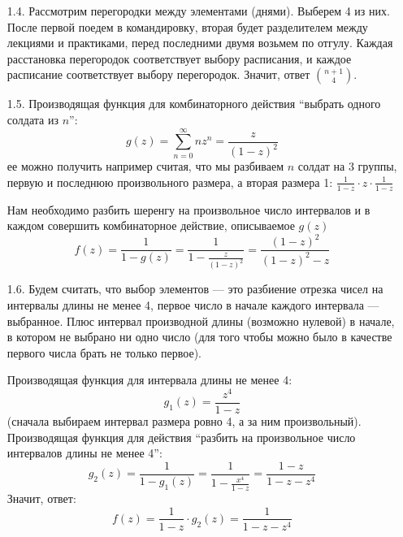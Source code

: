 \documentclass[10pt]{article}
\begin{document}
\begin{enumerate}
\item[1.4.] Рассмотрим перегородки между элементами (днями). Выберем 4 из них. После первой поедем в командировку, вторая будет разделителем между лекциями и практиками, перед последними двумя возьмем по отгулу. Каждая расстановка перегородок соответствует выбору расписания, и каждое расписание соответствует выбору перегородок. Значит, ответ $\binom{n+1}{4}$.

\item[1.5.] Производящая функция для комбинаторного действия ``выбрать одного солдата из $n$'': 
$$g(z) = \sum_{n=0}^\infty n z^n = \frac{z}{(1-z)^2}$$
ее можно получить например считая, что мы разбиваем $n$ солдат на 3 группы, первую и последнюю произвольного размера, а вторая размера 1: $\frac{1}{1-z} \cdot z \cdot \frac{1}{1-z}$

Нам необходимо разбить шеренгу на произвольное число интервалов и в каждом совершить комбинаторное действие, описываемое $g(z)$
$$f(z) = \frac{1}{1-g(z)} =\frac{1}{1-\frac{z}{(1-z)^2}} = \frac{(1-z)^2}{(1-z)^2 - z}$$

\item[1.6.] Будем считать, что выбор элементов --- это разбиение отрезка чисел на интервалы длины не менее 4, первое число в начале каждого интервала --- выбранное. Плюс интервал производной длины (возможно нулевой) в начале, в котором не выбрано ни одно число (для того чтобы можно было в качестве первого числа брать не только первое). 

Производящая функция для интервала длины не менее 4: 
$$g_1(z) = \frac{z^4}{1-z}$$
(сначала выбираем интервал размера ровно 4, а за ним произвольный).\\
Производящая функция для действия ``разбить на произвольное число интервалов длины не менее 4'':
$$g_2(z) = \frac{1}{1-g_1(z)} = \frac{1}{1 - \frac{x^4}{1-z}} = \frac{1-z}{1-z-z^4}$$
Значит, ответ: 
$$f(z) = \frac{1}{1-z} \cdot g_2(z) = \frac{1}{1-z-z^4}$$
\end{enumerate}
\end{document}
